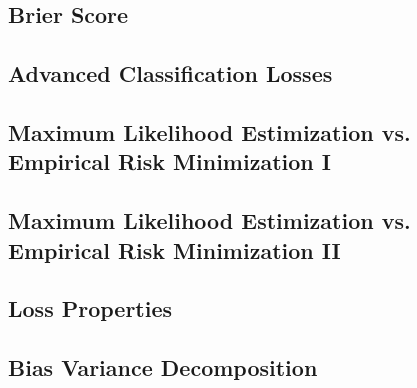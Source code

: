 \subsection{Brier Score}


\subsection{Advanced Classification Losses}


\subsection{Maximum Likelihood Estimization vs. Empirical Risk Minimization I}


\subsection{Maximum Likelihood Estimization vs. Empirical Risk Minimization II}


\subsection{Loss Properties}


\subsection{Bias Variance Decomposition}


